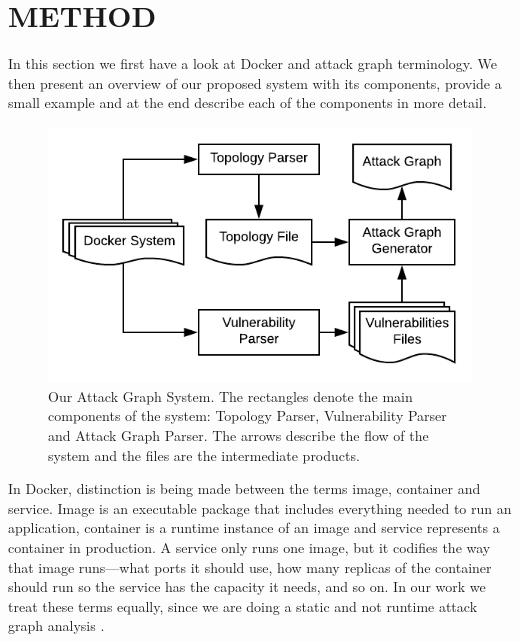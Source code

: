 \section{METHOD}
In this section we first have a look at Docker and attack graph terminology. We then present an overview of our proposed system with its components, provide a small example and at the end describe each of the components in more detail. 

\begin{figure}
	\includegraphics[width=\textwidth]{./images/AttackGraphSystem}
	\caption{Our Attack Graph System. The rectangles denote the main components of the system: Topology Parser, Vulnerability Parser and Attack Graph Parser. The arrows describe the flow of the system and the files are the intermediate products.}
	\label{AttackGraphSystem}
\end{figure}

In Docker, distinction is being made between the terms image, container and service. Image is an executable package that includes everything needed to run an application, container is a runtime instance of an image and service represents a container in production. A service only runs one image, but it codifies the way that image runs—what ports it should use, how many replicas of the container should run so the service has the capacity it needs, and so on. In our work we treat these terms equally, since we are doing a static and not runtime attack graph analysis \cite{merkel2014docker}.

